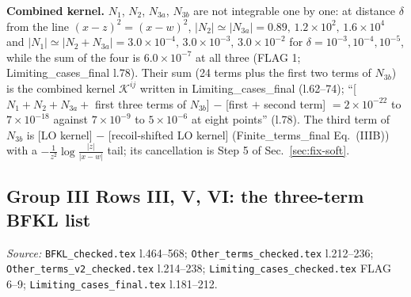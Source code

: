 \documentclass[10pt]{article}
\begin{document}
\noindent\textbf{Combined kernel.} $N_{1}$, $N_{2}$, $N_{3a}$, $N_{3b}$ are not integrable one by one: at distance $\delta$ from the line $(x-z)^{2}=(x-w)^{2}$, $|N_{2}|\simeq|N_{3a}|=0.89,\,1.2\times10^{2},\,1.6\times10^{4}$ and $|N_{1}|\simeq|N_{2}+N_{3a}|=3.0\times10^{-4},\,3.0\times10^{-3},\,3.0\times10^{-2}$ for $\delta=10^{-3},10^{-4},10^{-5}$, while the sum of the four is $6.0\times10^{-7}$ at all three (FLAG 1; Limiting\_cases\_final l.78). Their sum (24 terms plus the first two terms of $N_{3b}$) is the combined kernel $\mathcal{K}^{ij}$ written in Limiting\_cases\_final (l.62--74); ``[$N_{1}+N_{2}+N_{3a}+$ first three terms of $N_{3b}$] $-$ [first $+$ second term] $=2\times10^{-22}$ to $7\times10^{-18}$ against $7\times10^{-9}$ to $5\times10^{-6}$ at eight points'' (l.78). The third term of $N_{3b}$ is [LO kernel] $-$ [recoil-shifted LO kernel] (Finite\_terms\_final Eq.~(IIIB)) with a $-\frac{1}{z^{2}}\log\frac{|z|}{|x-w|}$ tail; its cancellation is Step 5 of Sec.~\ref{sec:fix-soft}.

\subsection{Group III Rows III, V, VI: the three-term BFKL list}\label{sec:calc-G3}
\noindent\emph{Source:} \texttt{BFKL\_checked.tex} l.464--568; \texttt{Other\_terms\_checked.tex} l.212--236; \texttt{Other\_terms\_v2\_checked.tex} l.214--238; \texttt{Limiting\_cases\_checked.tex} FLAG 6--9; \texttt{Limiting\_cases\_final.tex} l.181--212.
\end{document}

